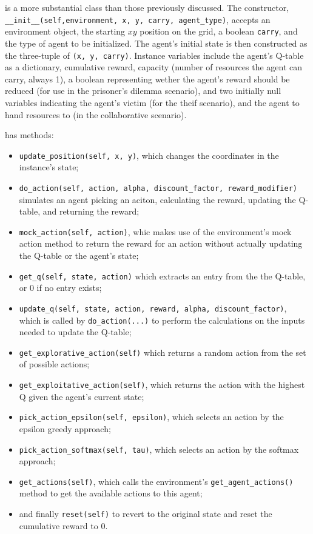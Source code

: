 \documentclass[11pt]{article}
\begin{document}
 is a more substantial class than those previously discussed. The constructor, \texttt{__init__(self,environment, x, y, carry, agent_type)}, accepts an environment object, the starting $xy$ position on the grid, a boolean \texttt{carry}, and the type of agent to be initialized. The agent's initial state is then constructed as the three-tuple of \texttt{(x, y, carry)}. Instance variables include the agent's Q-table as a dictionary, cumulative reward, capacity (number of resources the agent can carry, always 1), a boolean representing wether the agent's reward should be reduced (for use in the prisoner's dilemma scenario), and two initially null variables indicating the agent's victim (for the theif scenario), and the agent to hand resources to (in the collaborative scenario).

 has methods:
\begin{itemize}
\item \texttt{update_position(self, x, y)}, which changes the coordinates in the instance's state;
\item \texttt{do_action(self, action, alpha, discount_factor, reward_modifier)} simulates an agent picking an aciton, calculating the reward, updating the Q-table, and returning the reward;
\item \texttt{mock_action(self, action)}, whic makes use of the environment's mock action method to return the reward for an action without actually updating the Q-table or the agent's state;
\item \texttt{get_q(self, state, action)} which extracts an entry from the the Q-table, or 0 if no entry exists;
\item \texttt{update_q(self, state, action, reward, alpha, discount_factor)}, which is called by \texttt{do_action(...)} to perform the calculations on the inputs needed to update the Q-table;
\item \texttt{get_explorative_action(self)} which returns a random action from the set of possible actions;
\item \texttt{get_exploitative_action(self)}, which returns the action with the highest Q given the agent's current state;
\item \texttt{pick_action_epsilon(self, epsilon)}, which selects an action by the epsilon greedy approach;
\item \texttt{pick_action_softmax(self, tau)}, which selects an action by the softmax approach;
\item \texttt{get_actions(self)}, which calls the environment's \texttt{get_agent_actions()} method to get the available actions to this agent;
\item and finally \texttt{reset(self)} to revert to the original state and reset the cumulative reward to 0.
\end{itemize}
\end{document}
